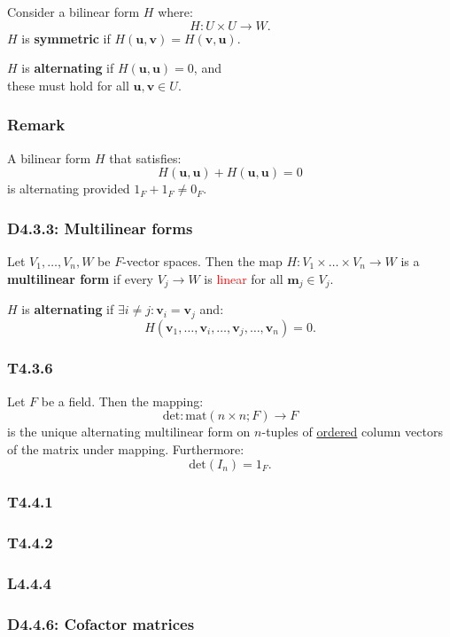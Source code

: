 \documentclass{article}
\newcommand{\vc}[1]{\boldsymbol{#1}}
\begin{document}
\begin{multicols*}{3}
Consider a bilinear form $H$ where:
$$H:U\times U\rightarrow W.$$
$H$ is \textbf{symmetric} if $H(\vc{u},\vc{v})=H(\vc{v},\vc{u})$.

$H$ is \textbf{alternating} if $H(\vc{u},\vc{u})=0$, and \\
these must hold for all $\vc{u},\vc{v}\in U$.

\subsubsection*{Remark}
A bilinear form $H$ that satisfies:
$$H(\vc{u},\vc{u})+H(\vc{u},\vc{u})=0$$
is alternating provided $1_F+1_F\neq0_F$.

\subsubsection*{D4.3.3: Multilinear forms}
Let $V_1,\dots,V_n,W$ be $F$-vector spaces. Then the map
$H:V_1\times\dots\times V_n\rightarrow W$ is a
\textbf{multilinear form} if every $V_j\rightarrow W$
is \textcolor{red}{linear} for all $\vc{m}_j\in V_j$.

$H$ is \textbf{alternating} if $\exists i\neq j:\vc{v}_i=\vc{v}_j$
and:
$$H(\vc{v}_1,\dots,\vc{v}_i,\dots,\vc{v}_j,\dots,\vc{v}_n)=0.$$

\subsubsection*{T4.3.6}
Let $F$ be a field. Then the mapping:
$$\text{det}:\text{mat}(n\times n; F)\rightarrow F$$
is the unique alternating multilinear form on $n$-tuples
of \underline{ordered} column vectors of the matrix
under mapping. Furthermore:
$$\text{det}(I_n)=1_F.$$

\subsubsection*{T4.4.1}

\subsubsection*{T4.4.2}

\subsubsection*{L4.4.4}

\subsubsection*{D4.4.6: Cofactor matrices}


\end{multicols*}
\end{document}
